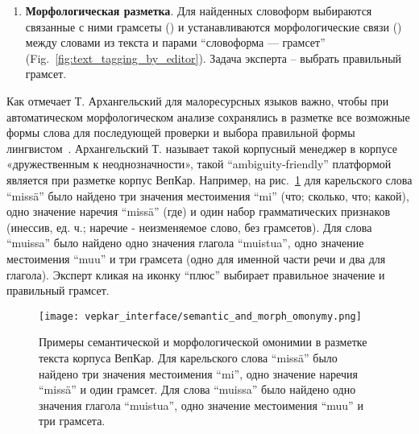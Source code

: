 \begin{enumerate}
\item \textbf{Морфологическая разметка}. 
Для найденных словоформ выбираются связанные с ними грамсеты  () и устанавливаются морфологические связи () между словами из текста и парами ``словоформа — грамсет'' (Fig.~\ref{fig:text_tagging_by_editor}). 
Задача эксперта -- выбрать правильный грамсет.


\end{enumerate}

Как отмечает Т. Архангельский для малоресурсных языков важно, чтобы при автоматическом морфологическом анализе сохранялись в разметке все возможные формы слова для последующей проверки и выбора правильной формы лингвистом~\cite[61]{Arkhangelskiy2020}. Архангельский Т. называет такой корпусный менеджер в корпусе «дружественным к неоднозначности», такой “ambiguity-friendly” платформой является при разметке корпус ВепКар.
Например, на рис.~\ref{fig:semantic_and_morph_omonymy} для карельского слова “missä” было найдено три значения местоимения “mi” (что; сколько, что; какой), одно значение наречия “missä” (где) и один набор грамматических признаков (инессив, ед. ч.; наречие - неизменяемое слово, без грамсетов). Для слова “muissa” было найдено одно значения глагола “muistua”, одно значение местоимения “muu” и три грамсета (одно для именной части речи и два для глагола). Эксперт кликая на иконку “плюс” выбирает правильное значение и правильный грамсет.

\begin{figure}
    \centering
    \texttt{[image: vepkar\_interface/semantic\_and\_morph\_omonymy.png]}
   \caption[Примеры семантической и морфологической омонимии в разметке текста корпуса ВепКар]{Примеры семантической и морфологической омонимии  в разметке текста корпуса ВепКар. 
Для карельского слова “missä” было найдено три значения местоимения “mi”, одно значение наречия “missä” и один грамсет. Для слова “muissa” было найдено одно значения глагола “muistua”, одно значение местоимения “muu” и три грамсета.} 
   \label{fig:semantic_and_morph_omonymy}
\end{figure}
 
